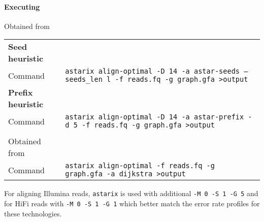 

\paragraph{Executing \astarix}
\noindent Obtained from \astarixurl \\
\begin{tabular}{lp{9.5cm}}
	\textbf{Seed heuristic} & \\
	\quad Command & \texttt{astarix align-optimal -D 14 -a astar-seeds --seeds\_len l -f reads.fq -g graph.gfa >output} \\
	\textbf{Prefix heuristic} & \\
	\quad Command & \texttt{astarix align-optimal -D 14 -a astar-prefix -d 5 -f reads.fq -g graph.gfa >output} \\
	\textbf{\dijkstra} & \\
	\quad Obtained from & \astarixurlwithbranch \\
	\quad Command & \texttt{astarix align-optimal -f reads.fq -g graph.gfa -a dijkstra >output}
\end{tabular}

For aligning Illumina reads, \texttt{astarix} is used with additional \texttt{-M
0 -S 1 -G 5} and for HiFi reads with \texttt{-M 0 -S 1 -G 1} which better match
the error rate profiles for these technologies.

